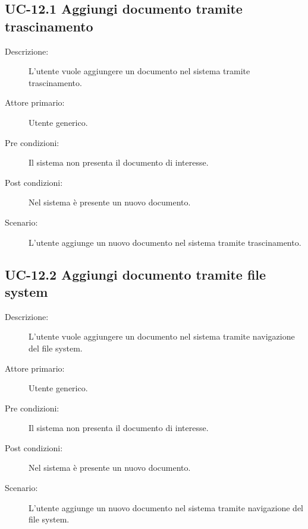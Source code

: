 \subsection{UC-12.1 Aggiungi documento tramite trascinamento}
\begin{description}
    \item[Descrizione:] L'utente vuole aggiungere un documento nel sistema tramite trascinamento.
    \item[Attore primario:] Utente generico.
    \item[Pre condizioni:] Il sistema non presenta il documento di interesse.
    \item[Post condizioni:] Nel sistema è presente un nuovo documento.
    \item[Scenario:] L'utente aggiunge un nuovo documento nel sistema tramite trascinamento.
\end{description}

\subsection{UC-12.2 Aggiungi documento tramite file system}
\begin{description}
    \item[Descrizione:] L'utente vuole aggiungere un documento nel sistema tramite navigazione del file system.
    \item[Attore primario:] Utente generico.
    \item[Pre condizioni:] Il sistema non presenta il documento di interesse.
    \item[Post condizioni:] Nel sistema è presente un nuovo documento.
    \item[Scenario:] L'utente aggiunge un nuovo documento nel sistema tramite navigazione del file system.
\end{description}


